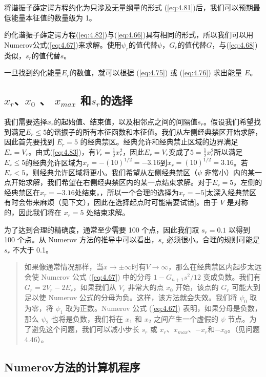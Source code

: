     将谐振子薛定谔方程约化为只涉及无量纲量的形式 (\ref{eq:4.81})后，我们可以预期最低能量本征值的数量级为 1。

    约化谐振子薛定谔方程(\ref{eq:4.82})与(\ref{eq:4.66})具有相同的形式，所以我们可以用Numerov公式(\ref{eq:4.67})来求解。使用$\psi_r$的值代替$\psi$，$G_r$的值代替$G$，与(\ref{eq:4.68})类似，$s_r$的值代替$s$。

    一旦找到约化能量$E_r$的数值，就可以根据 (\ref{eq:4.75}) 或 (\ref{eq:4.76}) 求出能量 $E$。

\subsection*{$x_r$、$x_0$ 、 $x_{max}$ 和$s_r$的选择}
    我们需要选择$x_r$的起始值、结束值，以及相邻点之间的间隔值$s_r$。假设我们希望找到满足$E_r \le 5$的谐振子的所有本征函数和本征值。我们从左侧经典禁区开始求解，因此首先要找到 $E_r=5$ 的经典禁区。经典允许和经典禁止区域的边界满足$E_r=V_r$。由式(\ref{eq:4.83})，有$V_r = \frac{1}{2}x_r^2$，因此$E_r=V_r$变成了$5=\frac{1}{2}x_r^2$所以满足$E_r \le 5$的经典允许区域为$x_r = -\left(10\right)^{1/2}=-3.16$到$x_r = \left(10\right)^{1/2}=3.16$。若$E_r<5$，则经典允许区域将更小。我们希望从左侧经典禁区（$\psi$ 非常小）内的某一点开始求解，我们希望在右侧经典禁区内的某一点结束求解。对于$E_r=5$，左侧的经典禁区在$x_r=-3.16$处结束，，所以一个合理的选择为$x_r=-5$[太深入经典禁区有时会带来麻烦（见下文），因此在选择起点时可能需要试错]。由于 $V$ 是对称的，因此我们将在 $x_r=5$ 处结束求解。

    为了达到合理的精确度，通常至少需要 100 个点，因此我们取 $s_r=0.1$ 以得到 100 个点。从 Numerov 方法的推导中可以看出，$s_r$ 必须很小。合理的规则可能是 $s_r$ 不大于 0.1。
    \begin{quote}
        \small
        \noindent
        如果像通常情况那样，当$x \to \pm \infty$时有$V \to \infty$，那么在经典禁区内起步太远会使 Numerov 公式 (\ref{eq:4.67}) 中的分母 $1-G_{n+1}s^2/12$ 变成负数。我们有 $G_r=2V_r-2E_r$，如果我们从 $V_r$ 非常大的点 $x_0$ 开始，该点的 $G_r$ 可能大到足以使 Numerov 公式的分母为负。这样，该方法就会失效。我们将 $\psi_0$ 取为零，将 $\psi_1$ 取为正数。Numerov 公式 (\ref{eq:4.67}) 表明，如果分母是负数，那么 $\psi_2$ 也将是负数，我们将在 $x_1$ 和 $x_2$ 之间产生一个虚假的 $\psi$ 节点。为了避免这个问题，我们可以减小步长 $s_r$ 或 $x_r$、$x_{max}$、$-x_r$和$-x_0$。（见问题 4.46）。
    \end{quote}

\subsection*{Numerov方法的计算机程序}

